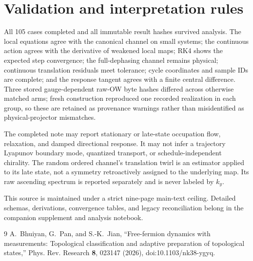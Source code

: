 \documentclass[aps,prb,twocolumn,nofootinbib,superscriptaddress,floatfix]{revtex4-2}
\begin{document}
\section{Validation and interpretation rules}

All 105 cases completed and all immutable result hashes survived analysis.  The local
equations agree with the canonical channel on small systems;
the continuous action agrees with the derivative of weakened local maps; RK4 shows the
expected step convergence; the full-dephasing channel remains physical; continuous
translation residuals meet tolerance; cycle coordinates and sample IDs are complete;
and the response tangent agrees with a finite central difference.  Three stored
gauge-dependent raw-OW byte hashes differed across otherwise matched arms; fresh
construction reproduced one recorded realization in each group, so these are retained
as provenance warnings rather than misidentified as physical-projector mismatches.

The completed note may report stationary or late-state occupation flow, relaxation,
and damped directional response.  It may not infer a trajectory Lyapunov boundary mode,
quantized transport, or schedule-independent chirality.  The random ordered channel's
translation twirl is an estimator applied to its late state, not a symmetry retroactively
assigned to the underlying map.  Its raw ascending spectrum is reported separately and
is never labeled by $k_y$.

This source is maintained under a strict nine-page main-text ceiling.  Detailed schemas,
derivations, convergence tables, and legacy
reconciliation belong in the companion supplement and analysis notebook.

\begin{thebibliography}{9}
A.~Bhuiyan, G.~Pan, and S.-K.~Jian,
``Free-fermion dynamics with measurements: Topological classification and adaptive
preparation of topological states,'' Phys. Rev. Research \textbf{8}, 023147 (2026),
doi:10.1103/nk38-ygyq.
\end{thebibliography}
\end{document}
